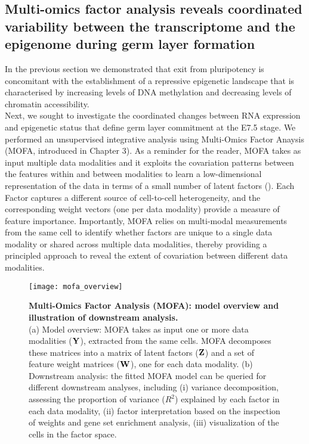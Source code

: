 \subsection{Multi-omics factor analysis reveals coordinated variability between the transcriptome and the epigenome during germ layer formation} \label{section:mofa_gastrulation}

In the previous section we demonstrated that exit from pluripotency is concomitant with the establishment of a repressive epigenetic landscape that is characterised by increasing levels of DNA methylation and decreasing levels of chromatin accessibility. \\
Next, we sought to investigate the coordinated changes between RNA expression and epigenetic status that define germ layer commitment at the E7.5 stage. We performed an unsupervised integrative analysis using Multi-Omics Factor Anaysis (MOFA, introduced in Chapter 3). As a reminder for the reader, MOFA takes as input multiple data modalities and it exploits the covariation patterns between the features within and between modalities to learn a low-dimensional representation of the data in terms of a small number of latent factors (). Each Factor captures a different source of cell-to-cell heterogeneity, and the corresponding weight vectors (one per data modality) provide a measure of feature importance. Importantly, MOFA relies on multi-modal measurements from the same cell to identify whether factors are unique to a single data modality or shared across multiple data modalities, thereby providing a principled approach to reveal the extent of covariation between different data modalities.

\begin{figure}[H]
	\texttt{[image: mofa\_overview]}
	\caption{
	\textbf{Multi-Omics Factor Analysis (MOFA): model overview and illustration of downstream analysis.} \\
	(a) Model overview: MOFA takes as input one or more data modalities (${\bf Y}$), extracted from the same cells. MOFA decomposes these matrices into a matrix of latent factors (${\bf Z}$) and a set of feature weight matrices (${\bf W}$), one for each data modality.
	(b) Downstream analysis: the fitted MOFA model can be queried for different downstream analyses, including (i) variance decomposition, assessing the proportion of variance ($R^2$) explained by each factor in each data modality, (ii) factor interpretation based on the inspection of weights and gene set enrichment analysis, (iii) visualization of the cells in the factor space. 
	}
	\label{fig:mofa_overview}
\end{figure}

